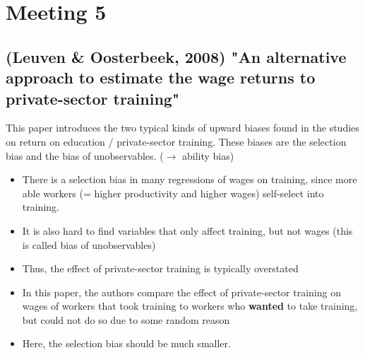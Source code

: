 \documentclass[12pt,a4paper]{article}
\begin{document}

\section{Meeting 5} %
\label{sec:Meeting 5}
  \subsection{(Leuven \& Oosterbeek, 2008) "An alternative approach to estimate the wage returns to private-sector training"} %
  \label{sub:}
  This paper introduces the two typical kinds of upward biases found in the studies on return on education / private-sector training. These biases
  are the selection bias and the bias of unobservables. ($\rightarrow$ ability bias)
  \begin{itemize}
    \item There is a selection bias in many regressions of wages on training, since more able workers (= higher productivity and higher wages) self-select into training.
    \item It is also hard to find variables that only affect training, but not wages (this is called bias of unobservables)
    \item Thus, the effect of private-sector training is typically overstated
    \item In this paper, the authors compare the effect of private-sector training on wages of workers that took training to workers who \textbf{wanted} to take training, but could not do so due to some random reason
    \item Here, the selection bias should be much smaller.
  \end{itemize}
\end{document}
